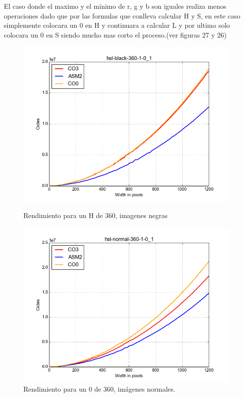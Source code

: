 \documentclass[a4paper]{article}
\begin{document}
El caso donde el maximo y el minimo de r, g y b son iguales realiza menos operaciones dado que por las formulas que conlleva calcular H y S, en este caso simplemente colocara un 0 en H y continuara a calcular L y por ultimo solo colocara un 0 en S siendo mucho mas corto el proceso.(ver figuras 27 y 26)

\begin{figure}[H]
  \begin{center}
    \includegraphics[scale=0.4]{imagenes/hsl6.png}
    \caption{Rendimiento para un H de 360, imagenes negras}
    \label{fig:exp1-1}
  \end{center}
  \endminipage\hfill
  \begin{center}
    \includegraphics[scale=0.4]{imagenes/hsl5.png}
    \caption{Rendimiento para un 0 de 360, imágenes normales.}
    \label{fig:exp1-0.5}
  \end{center}
  \endminipage\hfill
\end{figure}
\end{document}
